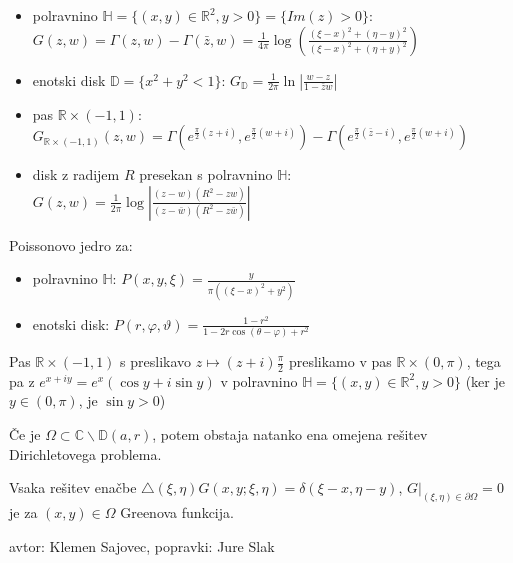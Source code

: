 \documentclass[10pt,a4paper]{amsart}
\theoremstyle{definition} %
\theoremstyle{plain} %
\newcommand{\R}{\mathbb R}
\newcommand{\C}{\mathbb C}
\begin{document}
\begin{itemize}

\item polravnino $\mathbb{H} = \{ (x,y) \in \R^2, y>0 \} = \{ Im(z) > 0 \}$:
  $G(z,w) = \Gamma (z,w) - \Gamma ( \bar{z},w) =  \frac{1}{4\pi} \log
  \left(\frac{(\xi -x)^2+(\eta -y)^2}{(\xi -x)^2+(\eta +y)^2}\right)$

\item enotski disk $\mathbb{D} = \{ x^2+y^2<1 \}$: $G_{\mathbb{D}} = \frac{1}{2\pi} \ln | \frac{w-z}{1-\bar{z}w} |$

\item pas $\R \times (-1,1)$: $G_{\R \times (-1,1)}(z,w) = \Gamma (e^{\frac{\pi}{2}(z+i)} , e^{\frac{\pi}{2}(w+i)}) - \Gamma (e^{\frac{\pi}{2}(\bar{z}-i)} , e^{\frac{\pi}{2}(w+i)})$

\item disk z radijem $R$ presekan s polravnino $\mathbb{H}$: $G(z, w) = \frac{1}{2 \pi}\log\left|\frac{(z-w)(R^2 - zw)}{(z-\bar{w})(R^2-z\bar{w})} \right|$

\end{itemize}

Poissonovo jedro za:

\begin{itemize}

\item  polravnino $\mathbb{H}$: $ P(x, y, \xi) = \frac{y}{\pi  \left((\xi -x)^2+y^2\right)}$

\item enotski disk: $P(r, \varphi, \vartheta) = \frac{1-r^2}{1 - 2r \cos(\theta -\varphi) +r^2}$

\end{itemize}

Pas  $\R \times (-1,1)$ s preslikavo $z \mapsto (z+i)\frac{\pi}{2}$ preslikamo v pas  $\R \times (0,\pi)$, tega pa z $e^{x+iy} = e^x(\cos y + i \sin y)$ v polravnino $\mathbb{H} = \{ (x,y) \in \R^2, y>0 \}$ (ker je $y \in (0,\pi)$, je $\sin y > 0$)

Če je $\Omega \subset \C \backslash \mathbb{D}(a,r)$, potem obstaja natanko ena omejena rešitev Dirichletovega problema.

Vsaka rešitev enačbe $\triangle (\xi, \eta) G(x,y;\xi,\eta) = \delta (\xi - x, \eta - y)$, $G|_{(\xi, \eta) \in \partial \Omega} = 0$ je za $(x,y) \in \Omega$ Greenova funkcija.


\vfill \hfill avtor: Klemen Sajovec, popravki: Jure Slak
\end{document}
